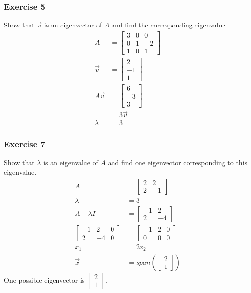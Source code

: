 \documentclass{math}
\begin{document}
\subsubsection*{Exercise 5}
Show that \( \vec{v} \) is an eigenvector of \( A \) and find the corresponding
eigenvalue.
\begin{align*}
  A &= \begin{bmatrix}
    3 & 0 & 0 \\
    0 & 1 & -2 \\
    1 & 0 & 1
  \end{bmatrix} \\
  \vec{v} &= \begin{bmatrix}2 \\ -1 \\ 1\end{bmatrix} \\
  A\vec{v} &= \begin{bmatrix}6 \\ -3 \\ 3\end{bmatrix} \\
  &= 3\vec{v} \\
  \lambda &= 3
\end{align*}

\subsubsection*{Exercise 7}
Show that \( \lambda \) is an eigenvalue of \( A \) and find one eigenvector
corresponding to this eigenvalue.
\begin{align*}
  A &= \begin{bmatrix}2 & 2 \\ 2 & -1\end{bmatrix} \\
  \lambda &= 3 \\
  A-\lambda I &= \begin{bmatrix}-1 & 2 \\ 2 & -4\end{bmatrix} \\
  \left[\begin{array}{cc|c}
    -1 & 2 & 0 \\
    2 & -4 & 0
  \end{array}\right] &= \begin{bmatrix}
    -1 & 2 & 0 \\
    0 & 0 & 0
  \end{bmatrix} \\
  x_1 &= 2x_2 \\
  \vec{x} &= span\left(\begin{bmatrix}2 \\ 1\end{bmatrix}\right)
\end{align*}
One possible eigenvector is \( \begin{bmatrix}2 \\ 1\end{bmatrix} \).
\end{document}
